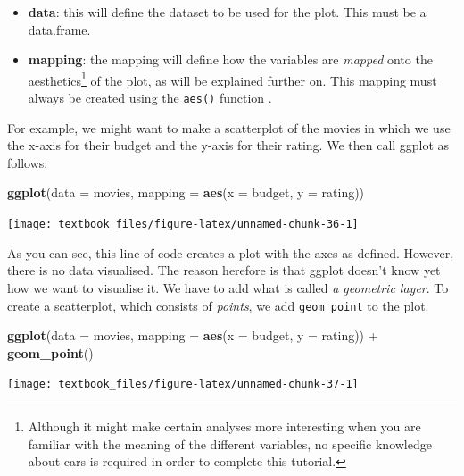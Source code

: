 \documentclass[]{tufte-book}
\newenvironment{Shaded}{}{}
\newcommand{\DataTypeTok}[1]{\textcolor[rgb]{0.56,0.13,0.00}{#1}}
\newcommand{\KeywordTok}[1]{\textcolor[rgb]{0.00,0.44,0.13}{\textbf{#1}}}
\newcommand{\NormalTok}[1]{#1}
\newcommand{\OperatorTok}[1]{\textcolor[rgb]{0.40,0.40,0.40}{#1}}
\newcommand{\StringTok}[1]{\textcolor[rgb]{0.25,0.44,0.63}{#1}}
\providecommand{\tightlist}{%
  \setlength{\itemsep}{0pt}\setlength{\parskip}{0pt}}
\begin{document}
\begin{itemize}
\tightlist
\item
  \textbf{data}: this will define the dataset to be used for the plot. This must be a data.frame.
\item
  \textbf{mapping}: the mapping will define how the variables are \emph{mapped} onto the aesthetics\footnote{Although it might make certain analyses more interesting when you are familiar with the meaning of the different variables, no specific knowledge about cars is required in order to complete this tutorial.} of the plot, as will be explained further on. This mapping must always be created using the \texttt{aes()} function .
\end{itemize}

For example, we might want to make a scatterplot of the movies in which we use the x-axis for their budget and the y-axis for their rating. We then call ggplot as follows:

\begin{Shaded}
\begin{Highlighting}[]
\KeywordTok{ggplot}\NormalTok{(}\DataTypeTok{data =}\NormalTok{ movies, }\DataTypeTok{mapping =} \KeywordTok{aes}\NormalTok{(}\DataTypeTok{x =}\NormalTok{ budget, }\DataTypeTok{y =}\NormalTok{ rating))}
\end{Highlighting}
\end{Shaded}

\texttt{[image: textbook\_files/figure-latex/unnamed-chunk-36-1]}

As you can see, this line of code creates a plot with the axes as defined. However, there is no data visualised. The reason herefore is that ggplot doesn't know yet how we want to visualise it. We have to add what is called \emph{a geometric layer}. To create a scatterplot, which consists of \emph{points}, we add \texttt{geom\_point} to the plot.

\begin{Shaded}
\begin{Highlighting}[]
\KeywordTok{ggplot}\NormalTok{(}\DataTypeTok{data =}\NormalTok{ movies, }\DataTypeTok{mapping =} \KeywordTok{aes}\NormalTok{(}\DataTypeTok{x =}\NormalTok{ budget, }\DataTypeTok{y =}\NormalTok{ rating)) }\OperatorTok{+}
\StringTok{    }\KeywordTok{geom_point}\NormalTok{()}
\end{Highlighting}
\end{Shaded}

\texttt{[image: textbook\_files/figure-latex/unnamed-chunk-37-1]}
\end{document}
